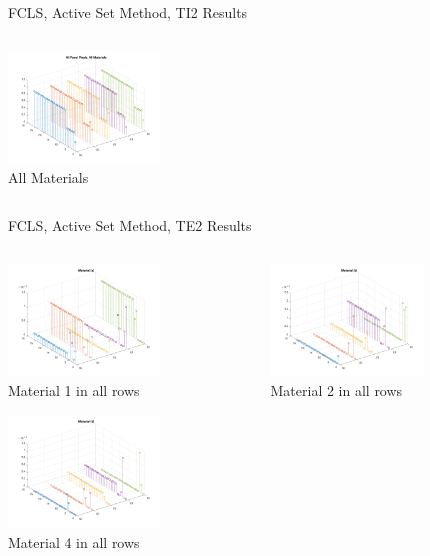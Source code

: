 \documentclass{beamer}
\begin{document}
\begin{frame}{FCLS, Active Set Method, TI2 Results}
\begin{columns}
\begin{column}{0.33\textwidth}
        \includegraphics[width=4cm,center]{fcls_ti2_allmaterials}
        \\ All Materials
        \centering
    \end{column}
\end{columns}
\end{frame}

\begin{frame}{FCLS, Active Set Method, TE2 Results}
\begin{columns}
    \begin{column}{0.33\textwidth}
        \includegraphics[width=4cm,center]{fcls_te2_material_stem_1}
        \\ Material 1 in all rows
        \centering

        \includegraphics[width=4cm,center]{fcls_te2_material_stem_4}
        \\ Material 4 in all rows
        \centering
    \end{column}
    \begin{column}{0.33\textwidth}
        \includegraphics[width=4cm,center]{fcls_te2_material_stem_2}
        \\ Material 2 in all rows
        \centering


\end{column}
\end{columns}
\end{frame}
\end{document}
